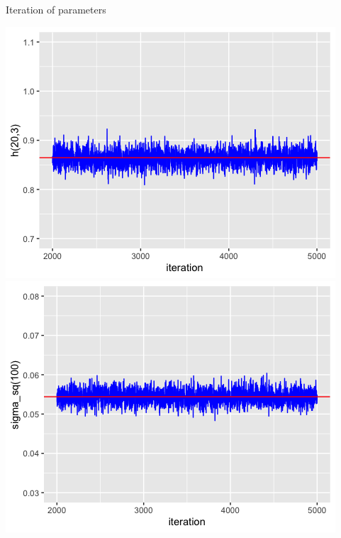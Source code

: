 \documentclass[10 pt]{beamer}
\begin{document}
\begin{frame}{Iteration of parameters}
\centerline{
\includegraphics[scale=0.35]{pic/h_20_3_iter.png}
\includegraphics[scale=0.35]{pic/sgm_sq_100_iter.png}}
\end{frame}
\end{document}
